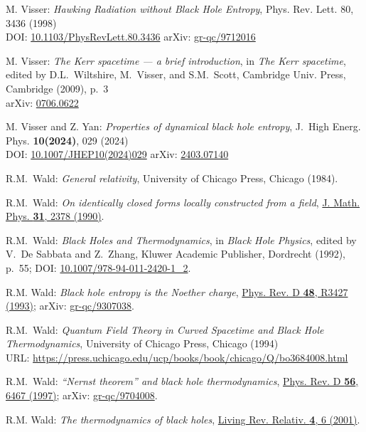 \begin{thebibliography}{123}
M. Visser: {\em Hawking Radiation without Black Hole Entropy},
Phys. Rev. Lett. 80, 3436 (1998)\\
DOI: \href{https://doi.org/10.1103/PhysRevLett.80.3436}{10.1103/PhysRevLett.80.3436}\hfill
arXiv: \href{https://arxiv.org/abs/gr-qc/9712016}{gr-qc/9712016}

M. Visser: {\em The Kerr spacetime --- a brief introduction},
in {\em The Kerr spacetime}, edited by D.L.~Wiltshire, M.~Visser, and S.M.~Scott,
Cambridge Univ. Press, Cambridge (2009), p.~3\\
arXiv: \href{https://arxiv.org/abs/0706.0622}{0706.0622}

M. Visser and Z. Yan:
{\em Properties of dynamical black hole entropy},
J.~High Energ. Phys. {\bf 10(2024)}, 029 (2024)\\
DOI: \href{https://doi.org/10.1007/JHEP10(2024)029}{10.1007/JHEP10(2024)029}\hfill
arXiv: \href{https://arxiv.org/abs/2403.07140}{2403.07140}

R.M.~Wald:
{\em General relativity},
University of Chicago Press, Chicago (1984).

R.M.~Wald:
{\em On identically closed forms locally constructed from a field},
\href{https://doi.org/10.1063/1.528839}{J. Math. Phys. {\bf 31}, 2378 (1990)}.

R.M.~Wald:
{\em Black Holes and Thermodynamics},
in {\em Black Hole Physics}, edited by V.~De Sabbata and Z.~Zhang,
Kluwer Academic Publisher, Dordrecht (1992), p.~55;
DOI: \href{https://doi.org/10.1007/978-94-011-2420-1_2}{10.1007/978-94-011-2420-1\_2}.

R.M. Wald:
{\em Black hole entropy is the Noether charge},
\href{https://doi.org/10.1103/PhysRevD.48.R3427}{Phys. Rev. D {\bf 48}, R3427 (1993)};
arXiv: \href{https://arxiv.org/abs/gr-qc/9307038}{gr-qc/9307038}.

R.M.~Wald:
{\em Quantum Field Theory in Curved Spacetime and Black Hole Thermodynamics},
University of Chicago Press, Chicago (1994)\\
URL: \url{https://press.uchicago.edu/ucp/books/book/chicago/Q/bo3684008.html}

R.M.~Wald:
{\em ``Nernst theorem'' and black hole thermodynamics},
\href{https://doi.org/10.1103/PhysRevD.56.6467}{Phys. Rev. D {\bf 56}, 6467 (1997)};
arXiv: \href{https://arxiv.org/abs/gr-qc/9704008}{gr-qc/9704008}.

R.M. Wald: {\em The thermodynamics of black holes},
\href{https://doi.org/10.12942/lrr-2001-6}{Living Rev. Relativ. {\bf 4}, 6 (2001)}.


\end{thebibliography}
